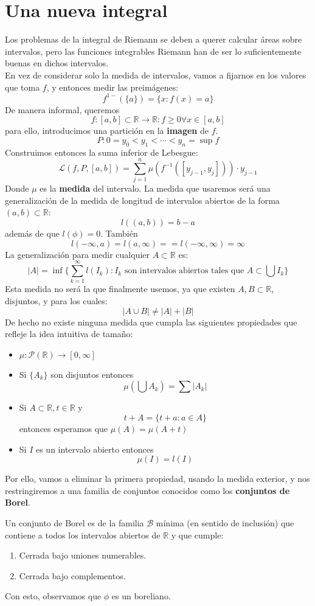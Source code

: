 \documentclass{./Calculo.tex}
\begin{document}
\section{Una nueva integral}
Los problemas de la integral de Riemann se deben a querer calcular áreas sobre intervalos, pero las funciones integrables Riemann han de ser lo suficientemente buenas en dichos intervalos.\\
En vez de considerar solo la medida de intervalos, vamos a fijarnos en los valores que toma $f$, y entonces medir las preimágenes:
\[
	f^{1-}(\{ a \}) = \{ x : f(x) = a \}
\]
De manera informal, queremos
\[
	f: [a,b] \subset \mathbb{R} \to \mathbb{R} : f \geq 0 \forall x \in [a,b]
\]
para ello, introducimos una partición en la \textbf{imagen} de $f$. 
\[
	P : 0 = y_0 < y_1 <\cdots < y_{n} = \sup f
\]
Construimos entonces la suma inferior de Lebesgue:
\[
	\mathcal{L}(f, P, [a,b]) = \sum _{j=1}^{n} \mu (f^{-1}([y_{j-1}, y_{j}])) \cdot y_{j-1}
\]
Donde $\mu$ es la \textbf{medida} del intervalo. La medida que usaremos será una generalización de la medida de longitud de intervalos abiertos de la forma $(a,b) \subset \mathbb{R}$:
\[
	l((a,b)) = b-a
\]
además de que $l(\phi) = 0$. También 
\[
	l(-\infty, a) = l(a,\infty) = = l(-\infty, \infty) = \infty
\]
La generalización para medir cualquier $A \subset \mathbb{R}$ es:
\[
	|A| = \inf \{ \sum_{k=1}^{\infty}l(I_{k}) : I_{k} \text{ son intervalos abiertos tales que }A \subset \bigcup I_{k} \}
\]
Esta medida no será la que finalmente usemos, ya que existen $A, B \subset  \mathbb{R}$, disjuntos, y para los cuales:
\[
	|A \cup B| \neq |A| + |B|
\]
De hecho no existe ninguna medida que cumpla las siguientes propiedades que refleje la idea intuitiva de tamaño:
\begin{itemize}
	\item $\mu: \mathcal{P}(\mathbb{R}) \to [0, \infty]$ 
	\item Si $\{ A_{k} \}$ son disjuntos entonces 
		\[
			\mu(\bigcup A_{k} ) = \sum |A_{k}|
		\]
	\item Si $A \subset \mathbb{R}, t \in \mathbb{R}$ y 
		\[
			t+ A = \{ t+a : a \in A \}
		\]
		entonces esperamos que $\mu(A) = \mu(A+t)$ 
	\item Si $I$ es un intervalo abierto entonces
		\[
			\mu(I) = l(I)
		\]
\end{itemize}
Por ello, vamos a eliminar la primera propiedad, usando la medida exterior, y nos restringiremos a una familia de conjuntos conocidos como los \textbf{conjuntos de Borel}.
\begin{defin}
	Un conjunto de Borel es de la familia $\mathcal{B}$ mínima (en sentido de inclusión) que contiene a todos los intervalos abiertos de $\mathbb{R}$ y que cumple:
	\begin{enumerate}
		\item Cerrada bajo uniones numerables.
		\item Cerrada bajo complementos.
	\end{enumerate}
\end{defin}
Con esto, observamos que $\phi$ es un boreliano.
\end{document}
